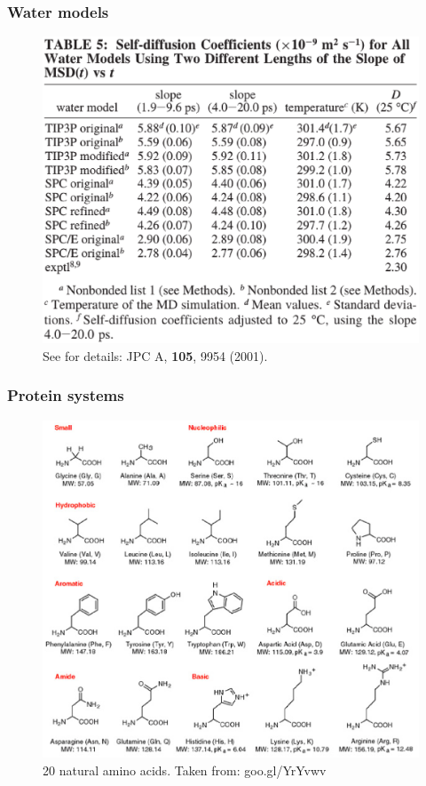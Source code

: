 \documentclass{beamer}
\begin{document}
\begin{frame}\frametitle{Water models}

\begin{figure}
\includegraphics[scale=0.3]{nilsson_water.eps}
\caption{{\scriptsize See for details: JPC A, {\bf 105}, 9954 (2001). }}
\end{figure}

\end{frame}


\begin{frame}\frametitle{Protein systems}

\begin{figure}
\includegraphics[scale=0.3]{aminoacids.eps}
\caption{{\scriptsize 20 natural amino acids. Taken from: goo.gl/YrYvwv}}
\end{figure}

\end{frame}
\end{document}
